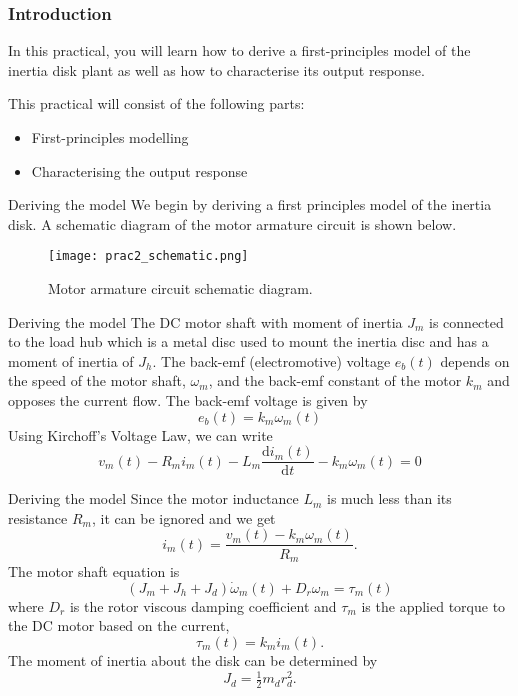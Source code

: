 \documentclass[9pt]{beamer-control}
\begin{document}

\begin{frame}
\frametitle{Introduction}
In this practical, you will learn how to derive a first-principles model of the inertia disk plant as well as how to characterise its output response.

\vfill

This practical will consist of the following parts:
\begin{itemize}
\item First-principles modelling
\item Characterising the output response
\end{itemize}
\end{frame}



\begin{frame}{Deriving the model}
We begin by deriving a first principles model of the inertia disk. A schematic diagram of the motor armature circuit is shown below.

\begin{figure}
	\centering
	\texttt{[image: prac2\_schematic.png]}
	\caption{Motor armature circuit schematic diagram.}
\end{figure}
\end{frame}

\begin{frame}{Deriving the model}
The DC motor shaft with moment of inertia $J_m$ is connected to the load hub which is a metal disc used to mount the inertia disc and has a moment of inertia of $J_h$. The back-emf (electromotive) voltage $e_b(t)$ depends on the speed of the motor shaft, $\omega_m$, and the back-emf constant of the motor $k_m$ and opposes the current flow. The back-emf voltage is given by 
\[e_b(t) = k_m \omega _m (t) \]
Using Kirchoff's Voltage Law, we can write
\[v_m(t) - R_m i_m(t)-L_m \frac{\mathrm{d} i_m(t)}{\mathrm{d} t} - k_m \omega_m (t) = 0\]

\end{frame}

\begin{frame}{Deriving the model}
Since the motor inductance $L_m$ is much less than its resistance $R_m$, it can be ignored and we get
\[i_m(t) = \frac{v_m(t) - k_m \omega_m (t)}{R_m} .\]
The motor shaft equation is
\[(J_m+J_h+J_d)\dot{\omega}_m (t) + D_r \omega _m = \tau_m(t)\]
where $D_r$ is the rotor viscous damping coefficient and $\tau_m$ is the applied torque to the DC motor based on the current,
\[ \tau_m(t) = k_m i_m (t).\]
The moment of inertia about the disk can be determined by
\[J_d = \tfrac{1}{2} m_d r_d^2.\]
\end{frame}
\end{document}
